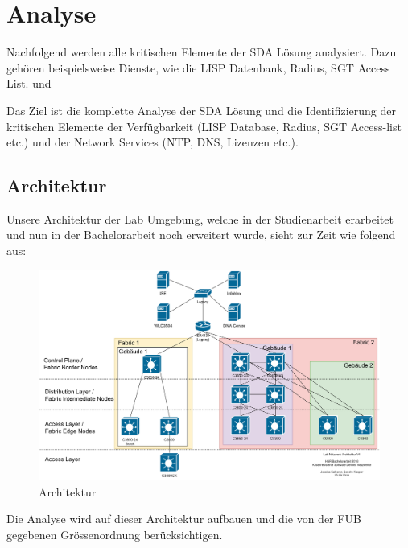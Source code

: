 \section{Analyse}
Nachfolgend werden alle kritischen Elemente der SDA Lösung analysiert. Dazu gehören beispielsweise Dienste, wie die LISP Datenbank, Radius, SGT Access List. und 

Das Ziel ist die komplette Analyse der SDA Lösung und die Identifizierung der kritischen Elemente der Verfügbarkeit (LISP Database, Radius, SGT Access-list etc.) und der Network Services (NTP, DNS, Lizenzen etc.).

\subsection{Architektur}
Unsere Architektur der Lab Umgebung, welche in der Studienarbeit erarbeitet und nun in der Bachelorarbeit noch erweitert wurde, sieht zur Zeit wie folgend aus:

\begin{figure}[H]
	\centering
	\includegraphics[width=1\linewidth]{img/Architecture/LabNetworkArchitecture-25-09}
	\caption{Architektur}
	\label{fig:Architektur}
\end{figure}

Die Analyse wird auf dieser Architektur aufbauen und die von der FUB gegebenen Grössenordnung berücksichtigen.